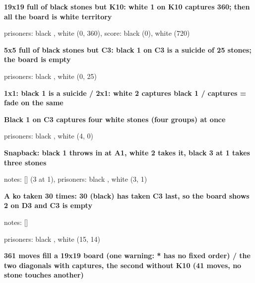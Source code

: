 \documentclass{article}
\newcommand\case[1]{\par\medskip\noindent\textbf{#1}\par\nopagebreak}
\newcommand\prisonerscount{prisoners: black \pgfgoprisoners{b}, white \pgfgoprisoners{w}}
\begin{document}
\case{19x19 full of black stones but K10: white 1 on K10 captures 360; then all the board is white territory}
\begin{goban}[19, scale = 0.35, captures]\end{goban}
\prisonerscount{} (0, 360), score: black  (0), white  (720)

\case{5x5 full of black stones but C3: black 1 on C3 is a suicide of 25 stones; the board is empty}
\begin{goban}[5, captures]\end{goban}
\prisonerscount{} (0, 25)

\case{1x1: black 1 is a suicide / 2x1: white 2 captures black 1 / captures = fade on the same}
\begin{goban}[1, captures]\end{goban}
\begin{goban}[2x1, captures]\end{goban}
\begin{goban}[2x1, captures = fade]\end{goban}

\case{Black 1 on C3 captures four white stones (four groups) at once}
\begin{goban}[5, captures]\end{goban}
\prisonerscount{} (4, 0)

\case{Snapback: black 1 throws in at A1, white 2 takes it, black 3 at 1 takes three stones}
\begin{goban}\end{goban}
notes: [\pgfgomovenotes] (3 at 1), \prisonerscount{} (3, 1)

\case{A ko taken 30 times: 30 (black) has taken C3 last, so the board shows 2 on D3 and C3 is empty}
\begin{goban}
\end{goban}

notes: [\pgfgomovenotes]

\prisonerscount{} (15, 14)

\case{361 moves fill a 19x19 board (one warning: * has no fixed order) / the two diagonals with captures, the second without K10 (41 moves, no stone touches another)}
\begin{goban}[19, scale = 0.5]\moves{*}\end{goban}
\begin{goban}[19, scale = 0.5, captures]\end{goban}
\end{document}
